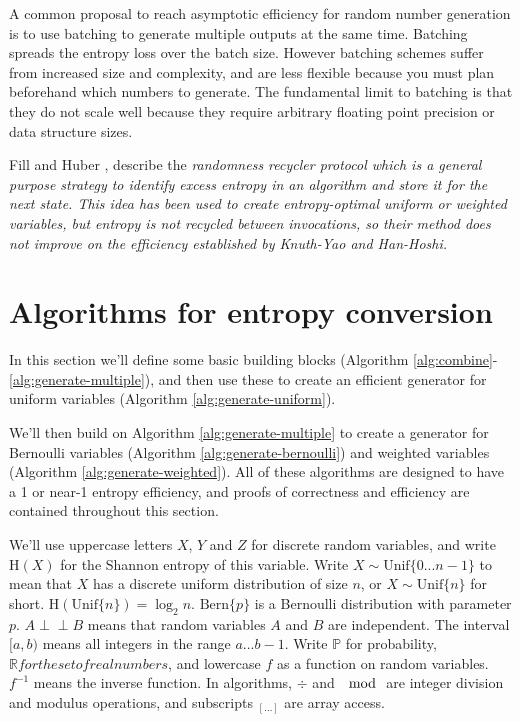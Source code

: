 \documentclass[12pt]{article}
\newcommand{\indep}{\perp\!\!\!\perp}
\newcommand{\unif}[1]{\mathrm{Unif}\{#1\}}
\newcommand{\bern}[1]{\mathrm{Bern}\{#1\}}
\newcommand{\entropy}[1]{\mathrm{H}(#1)}
\begin{document}
A common proposal to reach asymptotic efficiency for random number generation is to use batching to generate multiple outputs at the same time. \cite{bacher2017,han97,devroye86,Knuth1976TheCO,lumbroso2013optimal} Batching spreads the entropy loss over the batch size. However batching schemes suffer from increased size and complexity, and are less flexible because you must plan beforehand which numbers to generate. The fundamental limit to batching is that they do not scale well because they require arbitrary floating point precision or data structure sizes.

Fill and Huber \cite{fill2000randomness, huber2016perfect}, describe the \em randomness recycler \em protocol which is a general purpose strategy to identify excess entropy in an algorithm and store it for the next state. This idea has been used to create entropy-optimal uniform \cite{lumbroso2013optimal, huber2024optimalrollingfairdice} or weighted \cite{huber2024optimalrollingfairdice} variables, but entropy is not recycled between invocations, so their method does not improve on the efficiency established by Knuth-Yao and Han-Hoshi.


\section{Algorithms for entropy conversion}

In this section we'll define some basic building blocks (Algorithm \ref{alg:combine}-\ref{alg:generate-multiple}), and then use these to create an efficient generator for uniform variables (Algorithm \ref{alg:generate-uniform}).

We'll then build on Algorithm \ref{alg:generate-multiple} to create a generator for Bernoulli variables (Algorithm \ref{alg:generate-bernoulli}) and weighted variables (Algorithm \ref{alg:generate-weighted}). All of these algorithms are designed to have a 1 or near-1 entropy efficiency, and proofs of correctness and efficiency are contained throughout this section.

We'll use uppercase letters $X$, $Y$ and $Z$ for discrete random variables, and write $\entropy{X}$ for the Shannon entropy of this variable. Write $X \sim \unif{0 ... n-1}$ to mean that $X$ has a discrete uniform distribution of size $n$, or $X \sim \unif{n}$ for short. $\entropy{\unif{n}} = \log_2n$. $\bern{p}$ is a Bernoulli distribution with parameter $p$. $A \indep B$ means that random variables $A$ and $B$ are independent.  The interval $[a,b)$ means all integers in the range $a...b-1$. Write $\mathbb{P}$ for probability, $\mathbb{R} for the set of real numbers$, and lowercase $f$ as a function on random variables. $f^{-1}$ means the inverse function. In algorithms, $\div$ and $\mod$ are integer division and modulus operations, and subscripts $_{[...]}$ are array access.
\end{document}
